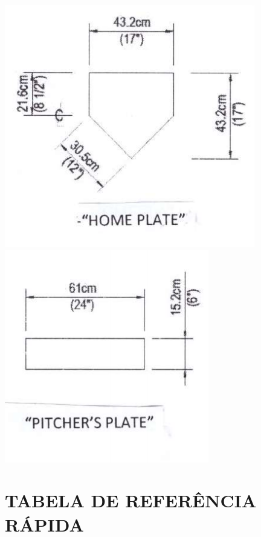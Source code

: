 {\begin{center}
		\includegraphics[width=.45\textwidth]{fig/home}
		\includegraphics[width=.45\textwidth]{fig/pitcher}
\end{center}}

\section{TABELA DE REFERÊNCIA RÁPIDA}

